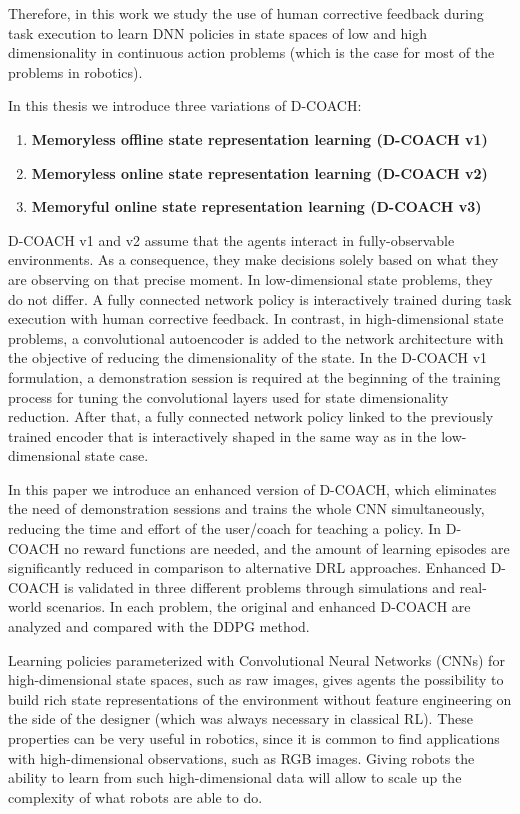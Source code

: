 \begin{intro}
Therefore, in this work we study the use of human corrective feedback during task execution to learn DNN policies in state spaces of low and high dimensionality in continuous action problems (which is the case for most of the problems in robotics).

In this thesis we introduce three variations of D-COACH:

\begin{enumerate}
    \item \textbf{Memoryless offline state representation learning (D-COACH v1)}
    \item \textbf{Memoryless online state representation learning (D-COACH v2)}
    \item \textbf{Memoryful online state representation learning (D-COACH v3)}
\end{enumerate}

D-COACH v1 and v2 assume that the agents interact in fully-observable environments. As a consequence, they make decisions solely based on what they are observing on that precise moment. In low-dimensional state problems, they do not differ. A fully connected network policy is interactively trained during task execution with human corrective feedback. In contrast, in high-dimensional state problems, a convolutional autoencoder is added to the network architecture with the objective of reducing the dimensionality of the state. In the D-COACH v1 formulation, a demonstration session is required at the beginning of the training process for tuning the convolutional layers used for state dimensionality reduction. After that, a fully connected network policy linked to the previously trained encoder that is interactively shaped in the same way as in the low-dimensional state case.

In this paper we introduce an enhanced version of D-COACH, which eliminates the need of demonstration sessions and trains the whole CNN simultaneously, reducing the time and effort of the user/coach for teaching a policy.  In D-COACH no reward functions are needed, and the amount of learning episodes are significantly reduced in comparison to alternative DRL approaches. Enhanced D-COACH is validated in three different problems through simulations and real-world scenarios. In each problem, the original and enhanced D-COACH are analyzed and compared with the DDPG method. 

Learning policies parameterized with Convolutional Neural Networks (CNNs) for high-dimensional state spaces, such as raw images, gives agents the possibility to build rich state representations of the environment without feature engineering on the side of the designer (which was always necessary in classical RL). These properties can be very useful in robotics, since it is common to find applications with high-dimensional observations, such as RGB images. Giving robots the ability to learn from such high-dimensional data will allow to scale up the complexity of what robots are able to do.


\end{intro}

